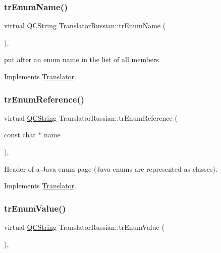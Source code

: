 \subsubsection{\texorpdfstring{trEnumName()}{trEnumName()}}
{\footnotesize\ttfamily virtual \mbox{\hyperlink{class_q_c_string}{Q\+C\+String}} Translator\+Russian\+::tr\+Enum\+Name (\begin{DoxyParamCaption}{ }\end{DoxyParamCaption})\hspace{0.3cm}{\ttfamily [inline]}, {\ttfamily [virtual]}}

put after an enum name in the list of all members 

Implements \mbox{\hyperlink{class_translator}{Translator}}.

\mbox{\label{class_translator_russian_a4e04ba56feac7c4d6e21ce3e837f75e4}} 
\subsubsection{\texorpdfstring{trEnumReference()}{trEnumReference()}}
{\footnotesize\ttfamily virtual \mbox{\hyperlink{class_q_c_string}{Q\+C\+String}} Translator\+Russian\+::tr\+Enum\+Reference (\begin{DoxyParamCaption}\item[{const char $\ast$}]{name }\end{DoxyParamCaption})\hspace{0.3cm}{\ttfamily [inline]}, {\ttfamily [virtual]}}

Header of a Java enum page (Java enums are represented as classes). 

Implements \mbox{\hyperlink{class_translator}{Translator}}.

\mbox{\label{class_translator_russian_a03121cad2e6b1335b17cfba7d8c98810}} 
\subsubsection{\texorpdfstring{trEnumValue()}{trEnumValue()}}
{\footnotesize\ttfamily virtual \mbox{\hyperlink{class_q_c_string}{Q\+C\+String}} Translator\+Russian\+::tr\+Enum\+Value (\begin{DoxyParamCaption}{ }\end{DoxyParamCaption})\hspace{0.3cm}{\ttfamily [inline]}, {\ttfamily [virtual]}}

